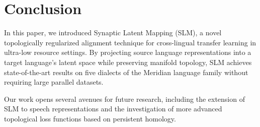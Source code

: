 \section{Conclusion}
In this paper, we introduced Synaptic Latent Mapping (SLM), a novel topologically regularized alignment technique for cross-lingual transfer learning in ultra-low resource settings. By projecting source language representations into a target language's latent space while preserving manifold topology, SLM achieves state-of-the-art results on five dialects of the Meridian language family without requiring large parallel datasets. 

Our work opens several avenues for future research, including the extension of SLM to speech representations and the investigation of more advanced topological loss functions based on persistent homology.



